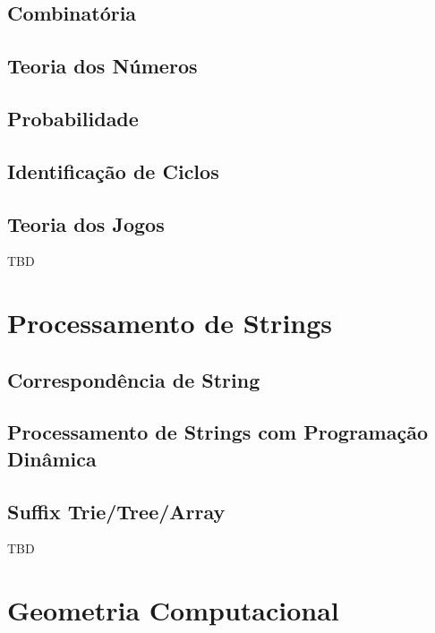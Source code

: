 \documentclass[11pt]{scrartcl}
\begin{document}
\subsection{Combinatória}

\subsection{Teoria dos Números}

\subsection{Probabilidade}

\subsection{Identificação de Ciclos}

\subsection{Teoria dos Jogos}

TBD


\section{Processamento de Strings}

\subsection{Correspondência de String}

\subsection{Processamento de Strings com Programação Dinâmica}

\subsection{Suffix Trie/Tree/Array}

TBD


\section{Geometria Computacional}
\end{document}
